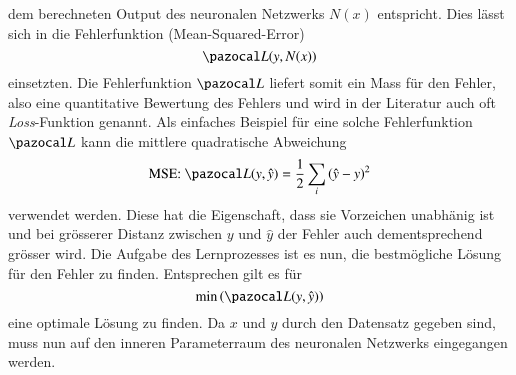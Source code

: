 dem berechneten Output des neuronalen Netzwerks $N(x)$ entspricht. Dies lässt sich in die Fehlerfunktion (Mean-Squared-Error)
\begin{equation}
\Lb(y,N(x))
\end{equation}
einsetzten.
Die Fehlerfunktion $\Lb$ liefert somit ein Mass für den Fehler, also eine quantitative Bewertung des Fehlers und wird in der Literatur auch oft \textit{Loss}-Funktion genannt. Als einfaches Beispiel für eine solche Fehlerfunktion $\Lb$ kann die mittlere quadratische Abweichung 
\begin{equation}
\text{MSE: } \Lb (y, \hat{y}) = \frac{1}{2} \sum_i \left( \hat{y} - y \right)^2
\label{ableitung:eqn:loss}
\end{equation}
verwendet werden. Diese hat die Eigenschaft, dass sie Vorzeichen unabhänig ist und bei grösserer Distanz zwischen $y$ und $\hat{y}$ der Fehler auch dementsprechend grösser wird.
Die Aufgabe des Lernprozesses ist es nun, die bestmögliche Lösung für den Fehler zu finden. Entsprechen gilt es für
\begin{equation}
	\min \left( \Lb(y,\hat{y}) \right) 
	\label{ableitung:eqn:min_loss}
\end{equation}
eine optimale Lösung zu finden. Da $x$ und $y$ durch den Datensatz gegeben sind, muss nun auf den inneren Parameterraum des neuronalen Netzwerks eingegangen werden.

